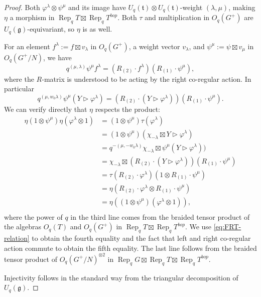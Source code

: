 \documentclass[a4paper]{article}
\numberwithin{equation}{section}
\newcommand{\1}{{\mathrm{1}\mkern-4mu{\mathchoice{}{}{\mskip-0.5mu}{\mskip-1mu}}\mathrm{l}}}
\DeclareMathOperator{\Rep}{Rep}
\renewcommand{\t}{\mathfrak{t}}
\newcommand{\g}{\mathfrak{g}}
\begin{document}
\begin{proof}
Both $\varphi^\lambda \otimes \psi^\mu$ and its image have $U_q(\t) \otimes U_q(\t)$-weight $(\lambda,\mu)$, making $\eta$ a morphism in $\Rep_qT\boxtimes \Rep_qT^{bop}$. Both $\tau$ and multiplication in $O_q(G^+)$ are $U_q(\g)$-equivariant, so $\eta$ is as well.

For an element $f^\lambda := f \boxtimes v_\lambda$ in $O_q(G^+)$, a weight vector $v_\lambda$, and $\psi^\mu := \psi \boxtimes v_\mu$ in $O_q(G^+/N)$, we have
\begin{equation}
    q^{(\mu,\lambda)} \psi^\mu f^\lambda = (R_{(2)}\cdot f^\lambda)(R_{(1)}\cdot \psi^\mu),
\end{equation}
where the $R$-matrix is understood to be acting by the right co-regular action.
In particular
\begin{equation}\label{eq:FRT-relation}
    q^{(\mu,w_0\lambda)}\psi^\mu (Y \rhd \varphi^\lambda) = (R_{(2)}\cdot (Y\rhd \varphi^\lambda))(R_{(1)}\cdot \psi^\mu).
\end{equation}
We can verify directly that $\eta$ respects the product:
\begin{equation}
    \begin{aligned}
    \eta(1 \otimes \psi^\mu)\eta(\varphi^\lambda \otimes 1) &= (1 \otimes \psi^\mu)\tau(\varphi^\lambda)\\
    &=(1 \otimes \psi^\mu)(\chi_{-\lambda}\boxtimes Y \rhd \varphi^\lambda)\\
    &=q^{-(\mu,-w_0\lambda)}\chi_{-\lambda}\boxtimes \psi^\mu (Y \rhd \varphi^\lambda)) \\
    &=\chi_{-\lambda}\boxtimes (R_{(2)}\cdot (Y\rhd \varphi^\lambda))(R_{(1)}\cdot \psi^\mu)\\
    &= \tau(R_{(2)}\cdot\varphi^\lambda )(1\otimes R_{(1)}\cdot\psi^\mu ) \\
    &=  \eta(R_{(2)}\cdot\varphi^\lambda \otimes R_{(1)}\cdot\psi^\mu )\\
     &=\eta((1 \otimes \psi^\mu)(\varphi^\lambda \otimes 1)) ,\\  
\end{aligned}
\end{equation}
where the power of $q$ in the third line comes from the braided tensor product of the algebras $O_q(T)$ and $O_q(G^+)$ in $ \Rep_qT \boxtimes \Rep_qT^{bop}$.
We use \eqref{eq:FRT-relation} to obtain the fourth equality and the fact that left and right co-regular action commute to obtain the fifth equality. The last line follows from the braided tensor product of $O_q(G^+/N)^{\otimes2}$ in $\Rep_qG\boxtimes \Rep_qT\boxtimes \Rep_qT^{bop}$.

Injectivity follows in the standard way from the triangular decomposition of $U_q(\g)$.
\end{proof}
\end{document}
